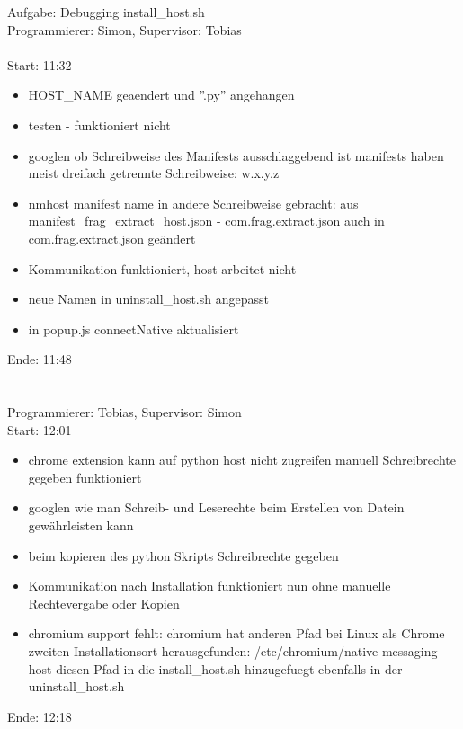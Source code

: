 \documentclass{report}
\begin{document}
\Large Aufgabe: Debugging install\_host.sh\\ \normalsize
Programmierer: Simon, Supervisor: Tobias\\
\\
Start: 11:32
\begin{itemize}
	\item HOST\_NAME geaendert und ''.py'' angehangen
	\item testen - funktioniert nicht
	\item googlen ob Schreibweise des Manifests ausschlaggebend ist
		\subitem manifests haben meist dreifach getrennte Schreibweise: w.x.y.z
	\item nmhost manifest name in andere Schreibweise gebracht:
		\subitem aus manifest\_frag\_extract\_host.json - com.frag.extract.json
		\subitem auch in com.frag.extract.json geändert
	\item Kommunikation funktioniert, host arbeitet nicht
	\item neue Namen in uninstall\_host.sh angepasst
	\item in popup.js connectNative aktualisiert
\end{itemize}
Ende: 11:48\\
\\\\
Programmierer: Tobias, Supervisor: Simon\\

Start: 12:01
\begin{itemize}
	\item chrome extension kann auf python host nicht zugreifen
		\subitem manuell Schreibrechte gegeben
		\subitem funktioniert
	\item googlen wie man Schreib- und Leserechte beim Erstellen von Datein gewährleisten kann
	\item beim kopieren des python Skripts Schreibrechte gegeben
	\item Kommunikation nach Installation funktioniert nun ohne manuelle Rechtevergabe oder Kopien

	\item chromium support fehlt:
		\subitem chromium hat anderen Pfad bei Linux als Chrome
		\subitem zweiten Installationsort herausgefunden: /etc/chromium/native-messaging-host
		\subitem diesen Pfad in die install\_host.sh hinzugefuegt
		\subitem ebenfalls in der uninstall\_host.sh
\end{itemize}
Ende: 12:18
\end{document}
